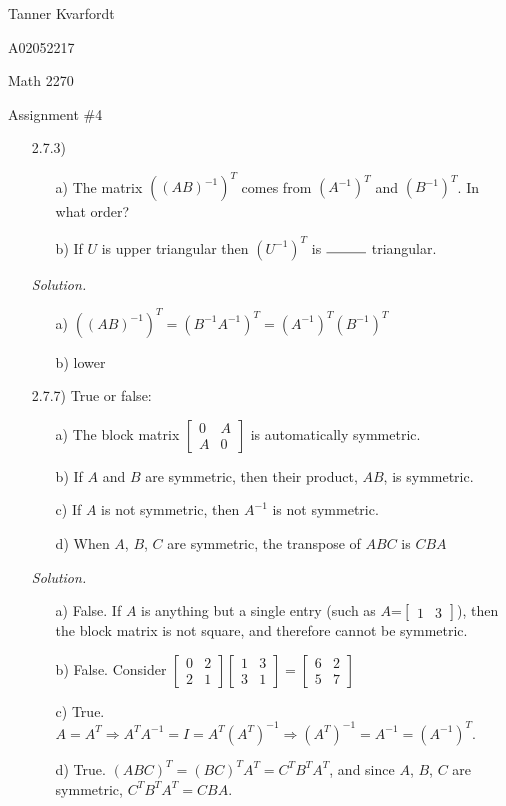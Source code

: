 \documentclass[12pt]{article}
\begin{document}
\hfill Tanner Kvarfordt 

\hfill A02052217

\hfill Math 2270

\hfill Assignment \#4


\begin{itemize}
\item[2.7.3)] 
\begin{itemize}
\item[a)] The matrix $((AB)^{-1})^T$ comes from $(A^{-1})^T$ and $(B^{-1})^T$. In what order?
\item[b)] If $U$ is upper triangular then $(U^{-1})^T$ is $\rule{1cm}{0.15mm}$ triangular.
\end{itemize}

\textit{Solution.}
\begin{itemize}
\item[a)] $((AB)^{-1})^T = (B^{-1}A^{-1})^T = (A^{-1})^T(B^{-1})^T$
\item[b)] lower
\end{itemize}

\item[2.7.7)] True or false:
\begin{itemize}
\item[a)] The block matrix $\left[\begin{array}{cc} 0 & A \\ A & 0\end{array}\right]$ is automatically symmetric.
\item[b)] If $A$ and $B$ are symmetric, then their product, $AB$, is symmetric.
\item[c)] If $A$ is not symmetric, then $A^{-1}$ is not symmetric.
\item[d)] When $A$, $B$, $C$ are symmetric, the transpose of $ABC$ is $CBA$
\end{itemize}

\textit{Solution.}
\begin{itemize}
\item[a)] False. If $A$ is anything but a single entry (such as $A$=$\left[\begin{array}{cc} 1 & 3 \end{array}\right]$), then the block matrix is not square, and therefore cannot be symmetric.
\item[b)] False. Consider $\left[\begin{array}{cc} 0 & 2 \\ 2 & 1\end{array}\right]
\left[\begin{array}{cc} 1 & 3 \\ 3 & 1\end{array}\right]=\left[\begin{array}{cc} 6 & 2 \\ 5 & 7\end{array}\right]$
\item[c)] True. $A=A^T \Rightarrow A^TA^{-1}=I=A^T(A^T)^{-1} \Rightarrow (A^T)^{-1}=A^{-1}=(A^{-1})^T$.
\item[d)] True. $(ABC)^T=(BC)^TA^T=C^TB^TA^T$, and since $A$, $B$, $C$ are symmetric, $C^TB^TA^T=CBA$.
\end{itemize}
 


\end{itemize}
\end{document}
